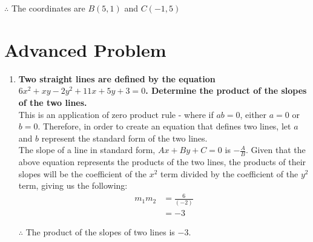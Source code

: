 \documentclass[12pt]{article}
\begin{document}
\begin{enumerate}
    $\therefore$ The coordinates are $B(5, 1)$ and $C(-1, 5)$ \newpage
    
\end{enumerate}

\section*{Advanced Problem}
\begin{enumerate}
    \item \textbf{Two straight lines are defined by the equation $6x^2 + xy - 2y^2 + 11x + 5y + 3 = 0$. Determine the product of the slopes of the two lines.} \\
    
    This is an application of zero product rule - where if $ab = 0$, either $a = 0$ or $b = 0$. Therefore, in order to create an equation that defines two lines, let $a$ and $b$ represent the standard form of the two lines. \\
    
    The slope of a line in standard form, $Ax + By + C = 0$ is $-\frac{A}{B}$. Given that the above equation represents the products of the two lines, the products of their slopes will be the coefficient of the $x^2$ term divided by the coefficient of the $y^2$ term, giving us the following:
    \begin{align*}
        m_1m_2 &= \frac{6}{(-2)} \\
        &= -3
    \end{align*}

    $\therefore$ The product of the slopes of two lines is $-3$.
    
\end{enumerate}
\end{document}
